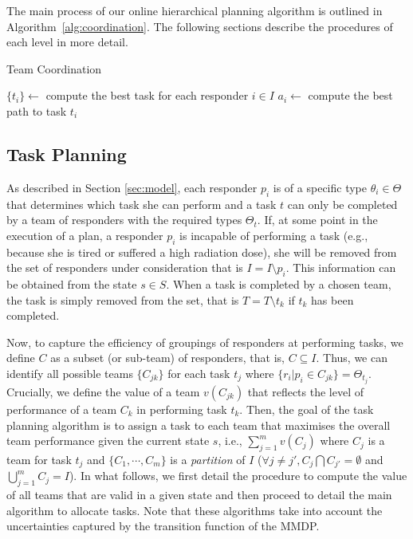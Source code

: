 The main process of our online hierarchical planning algorithm is
outlined in Algorithm~\ref{alg:coordination}. The following
sections describe the procedures of each level in more detail.

\begin{algorithm}[t]
  \caption{Team Coordination}\small
  \label{alg:coordination}
  \Indm
  \Indp\BlankLine
  $\{ t_i \} \gets$ compute the best task for each responder $i\in I$ \;
   {
    $a_i \gets$ compute the best path to task $t_i$ \;
  }
  \vspace{-1mm}
\end{algorithm}


\subsection{Task Planning}
\label{sec:taskplanning}
\noindent As described in Section \ref{sec:model}, each responder
$p_i$ is of a specific type $\theta_i \in \Theta$ that determines which task
she can perform and  a task $t$ can only be completed by a team of
responders with the required types $\Theta_t$. If, at some point in
the execution of a plan, a responder $p_i$ is incapable of
performing a task (e.g., because she is tired or suffered a high
radiation dose), she will be removed from the set of responders
under consideration that is $I = I \setminus p_i$. This
information can be obtained from the state $s \in S$. When a task
is completed by a chosen team, the task is simply removed from the
set, that is $T = T\setminus t_k$ if $t_k$ has been completed.

Now, to capture the efficiency of groupings of responders at
performing tasks, we define  $C$ as a subset (or sub-team) of
responders, that is, $C \subseteq I$. Thus, we can identify all
possible teams $\{ C_{jk} \}$ for each task $t_j$ where $\{r_i
| p_i \in C_{jk}\} = \Theta_{t_j}$. Crucially, we define the value of
a team $v(C_{jk})$ that reflects the level of performance of a team
$C_k$ in performing task $t_k$.  Then, the goal of the task
planning algorithm is to assign a task to each team that maximises
the overall team performance given the current state $s$, i.e.,
$\sum_{j=1}^m v(C_j)$ where $C_j$ is a team for task $t_j$ and $\{
C_1, \cdots, C_m \}$ is a {\em partition} of $I$ ($\forall j\neq
j', C_j \bigcap C_{j'} = \emptyset$ and $\bigcup_{j=1}^m C_j=I$).
In what follows, we first detail the procedure to compute the value
of all teams that are valid in a given state and then proceed
to detail the main algorithm to allocate tasks. Note that these
algorithms take into account the uncertainties captured by the
transition function of the MMDP.


